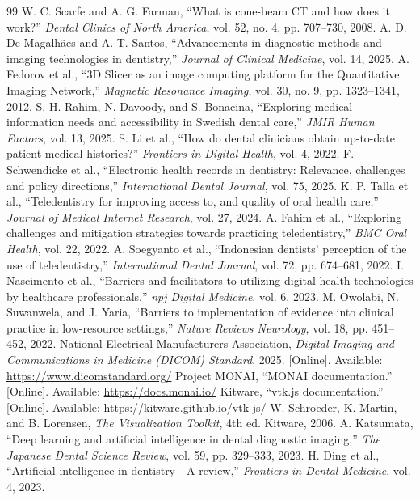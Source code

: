 \documentclass[12pt,a4paper,oneside]{report}
\begin{document}
\begin{thebibliography}{99}
 W. C. Scarfe and A. G. Farman, ``What is cone-beam CT and how does it work?'' \emph{Dental Clinics of North America}, vol. 52, no. 4, pp. 707--730, 2008.
 A. D. De Magalh\~{a}es and A. T. Santos, ``Advancements in diagnostic methods and imaging technologies in dentistry,'' \emph{Journal of Clinical Medicine}, vol. 14, 2025.
 A. Fedorov et al., ``3D Slicer as an image computing platform for the Quantitative Imaging Network,'' \emph{Magnetic Resonance Imaging}, vol. 30, no. 9, pp. 1323--1341, 2012.
 S. H. Rahim, N. Davoody, and S. Bonacina, ``Exploring medical information needs and accessibility in Swedish dental care,'' \emph{JMIR Human Factors}, vol. 13, 2025.
 S. Li et al., ``How do dental clinicians obtain up-to-date patient medical histories?'' \emph{Frontiers in Digital Health}, vol. 4, 2022.
 F. Schwendicke et al., ``Electronic health records in dentistry: Relevance, challenges and policy directions,'' \emph{International Dental Journal}, vol. 75, 2025.
 K. P. Talla et al., ``Teledentistry for improving access to, and quality of oral health care,'' \emph{Journal of Medical Internet Research}, vol. 27, 2024.
 A. Fahim et al., ``Exploring challenges and mitigation strategies towards practicing teledentistry,'' \emph{BMC Oral Health}, vol. 22, 2022.
 A. Soegyanto et al., ``Indonesian dentists' perception of the use of teledentistry,'' \emph{International Dental Journal}, vol. 72, pp. 674--681, 2022.
 I. Nascimento et al., ``Barriers and facilitators to utilizing digital health technologies by healthcare professionals,'' \emph{npj Digital Medicine}, vol. 6, 2023.
 M. Owolabi, N. Suwanwela, and J. Yaria, ``Barriers to implementation of evidence into clinical practice in low-resource settings,'' \emph{Nature Reviews Neurology}, vol. 18, pp. 451--452, 2022.
 National Electrical Manufacturers Association, \emph{Digital Imaging and Communications in Medicine (DICOM) Standard}, 2025. [Online]. Available: \url{https://www.dicomstandard.org/}
 Project MONAI, ``MONAI documentation.'' [Online]. Available: \url{https://docs.monai.io/}
 Kitware, ``vtk.js documentation.'' [Online]. Available: \url{https://kitware.github.io/vtk-js/}
 W. Schroeder, K. Martin, and B. Lorensen, \emph{The Visualization Toolkit}, 4th ed. Kitware, 2006.
 A. Katsumata, ``Deep learning and artificial intelligence in dental diagnostic imaging,'' \emph{The Japanese Dental Science Review}, vol. 59, pp. 329--333, 2023.
 H. Ding et al., ``Artificial intelligence in dentistry---A review,'' \emph{Frontiers in Dental Medicine}, vol. 4, 2023.
\end{thebibliography}
\end{document}
